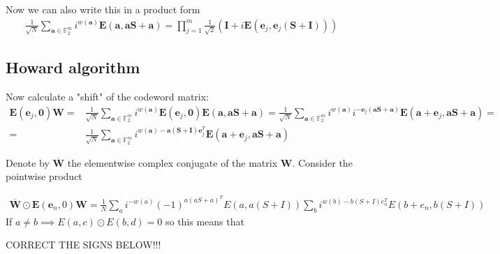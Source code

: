 \documentclass{article}
\begin{document}
	Now we can also write this in a product form
	\begin{align*}
		\frac{1}{\sqrt{N}} \sum_{\mathbf{a} \in \mathbb{F}^m_2} i^{w(\mathbf{a})}\mathbf{E}(\mathbf{a},\mathbf{a}\mathbf{S} + \mathbf{a}) = \prod_{j = 1}^m\frac{1}{\sqrt{2}}(\mathbf{I} + i\mathbf{E}(\mathbf{e}_j, \mathbf{e}_j(\mathbf{S} + \mathbf{I})))
	\end{align*}
	\subsection*{Howard algorithm}
	Now calculate a "shift" of the codeword matrix:
	\begin{align*}
		\mathbf{E}(\mathbf{e}_j, \mathbf{0})\mathbf{W} = &\frac{1}{\sqrt{N}} \sum_{\mathbf{a} \in \mathbb{F}^m_2} i^{w(\mathbf{a})}\mathbf{E}(\mathbf{e}_j,\mathbf{0})\mathbf{E}(\mathbf{a},\mathbf{a}\mathbf{S} + \mathbf{a}) = \frac{1}{\sqrt{N}} \sum_{\mathbf{a} \in \mathbb{F}^m_2} i^{w(\mathbf{a})}i^{-\mathbf{e}_j(\mathbf{a}\mathbf{S} + \mathbf{a})}\mathbf{E}(\mathbf{a} + \mathbf{e}_j,\mathbf{a}\mathbf{S} + \mathbf{a})  = \\ = &\frac{1}{\sqrt{N}} \sum_{\mathbf{a} \in \mathbb{F}^m_2} i^{w(\mathbf{a})-\mathbf{a}(\mathbf{S} + \mathbf{I})\mathbf{e}_j^T}\mathbf{E}(\mathbf{a} + \mathbf{e}_j,\mathbf{a}\mathbf{S} + \mathbf{a})
	\end{align*}
	
	\vspace{10mm}
	
	Denote by $\overline{\mathbf{W}}$ the elementwise complex conjugate of the matrix $\mathbf{W}$. Consider the pointwise product
	
	\begin{align*}
		\overline{\mathbf{W}} \odot \mathbf{E}(\mathbf{e}_n, 0)\mathbf{W} = \frac{1}{N} \sum_a i^{-w(a)}(-1)^{a(aS + a)^T} E(a, a(S + I)) \sum_b i^{w(b) - b(S + I)e_n^T} E(b + e_n, b(S + I))
	\end{align*}
	If $a \neq b \implies E(a, c) \odot E(b, d) = 0$ so this means that
	
	CORRECT THE SIGNS BELOW!!!
	
\end{document}
